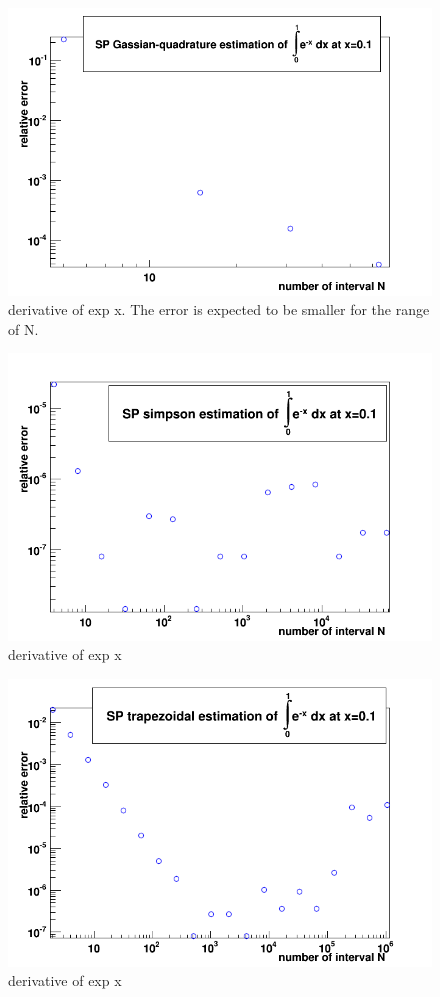 \documentclass[%
aip,
 jmp,%
 amsmath,amssymb,
preprint,%
]{revtex4-1}
\begin{document}
\begin{figure}
\includegraphics[scale=0.6]{2_gaussian} 
\caption{ derivative of exp x. The error is expected to be smaller for the range of N. }
\label{sat}
\end{figure}

\begin{figure}
\includegraphics[scale=0.6]{2_simpson} 
\caption{ derivative of exp x}
\label{sat}
\end{figure}

\begin{figure}
\includegraphics[scale=0.6]{2_trapezoid} 
\caption{ derivative of exp x}
\label{sat}
\end{figure}
\end{document}
